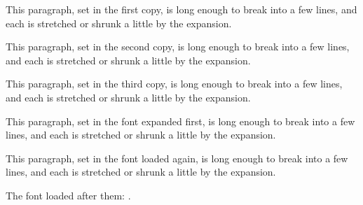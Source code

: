 \documentclass{article}
\begin{document}
\one This paragraph, set in the first copy, is long enough to break into
a few lines, and each is stretched or shrunk a little by the expansion.
\par
\two This paragraph, set in the second copy, is long enough to break into
a few lines, and each is stretched or shrunk a little by the expansion.
\par
\three This paragraph, set in the third copy, is long enough to break into
a few lines, and each is stretched or shrunk a little by the expansion.
\par
\plain This paragraph, set in the font expanded first, is long enough to break
into a few lines, and each is stretched or shrunk a little by the expansion.
\par
\again This paragraph, set in the font loaded again, is long enough to break
into a few lines, and each is stretched or shrunk a little by the expansion.
\par
\later The font loaded after them: \pdffontname\later.
\end{document}
